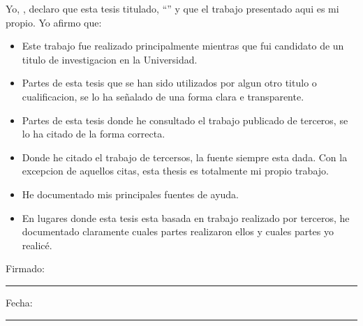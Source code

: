 \documentclass[
11pt, %
spanish, %
singlespacing, %
headsepline, %
]{MastersDoctoralThesis} %
\begin{document}

\begin{declaration}
\noindent Yo, \authorname, declaro que esta tesis titulado, \enquote{\ttitle} y que el trabajo presentado aqui es mi propio. Yo afirmo que:

\begin{itemize} 
\item Este trabajo fue realizado principalmente mientras que fui candidato de un titulo de investigacion en la Universidad.
\item Partes de esta tesis que se han sido utilizados por algun otro titulo o cualificacion, se lo ha señalado de una forma clara e transparente. 
\item Partes de esta tesis donde he consultado el trabajo publicado de terceros, se lo ha citado de la forma correcta.
\item Donde he citado el trabajo de tercersos, la fuente siempre esta dada. Con la excepcion de aquellos citas, esta thesis es totalmente mi propio trabajo.
\item He documentado mis principales fuentes de ayuda.
\item En lugares donde esta tesis esta basada en trabajo realizado por terceros, he documentado claramente cuales partes realizaron ellos y cuales partes yo realicé.\\
\end{itemize}
 
\noindent Firmado:\\
\rule[0.5em]{25em}{0.5pt} %
 
\noindent Fecha:\\
\rule[0.5em]{25em}{0.5pt} %
\end{declaration}

\cleardoublepage


\vspace*{0.2\textheight}
\end{document}
